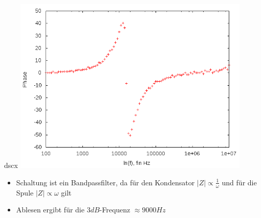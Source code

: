 \documentclass[compress,11pt]{beamer}
\begin{document}
\begin{frame}
\begin{block}{dscx}
\includegraphics[width=0.85\textwidth]{../daten/Messdaten/plots/Aufgabe4bschaltung2_lin_phase}

\end{block}
\end{frame}
\begin{frame}
\begin{itemize}
\item Schaltung ist ein Bandpassfilter, da für den Kondensator $|Z| \propto \frac{1}{\omega}$ und für die Spule $|Z| \propto \omega $ gilt
\item Ablesen ergibt für die $3 dB$-Frequenz $\approx 9000 Hz$
\end{itemize}
\end{frame}
\end{document}
